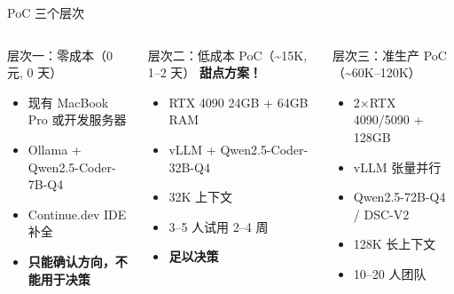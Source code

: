 \documentclass[UTF8,11pt,aspectratio=169]{beamer}
\begin{document}
\begin{frame}{PoC 三个层次}
  \begin{columns}[T]
    \begin{block}{层次一：零成本（0 元, 0 天）}
      \begin{itemize}
        \item 现有 MacBook Pro 或开发服务器
        \item Ollama + Qwen2.5-Coder-7B-Q4
        \item Continue.dev IDE 补全
        \item \textbf{只能确认方向，不能用于决策}
      \end{itemize}
    \end{block}

    \begin{alertblock}{层次二：低成本 PoC（\textasciitilde \textyen{}15K, 1--2 天）}
      \textbf{甜点方案！}
      \begin{itemize}
        \item RTX 4090 24GB + 64GB RAM
        \item vLLM + Qwen2.5-Coder-32B-Q4
        \item 32K 上下文
        \item 3--5 人试用 2--4 周
        \item \textbf{足以决策}
      \end{itemize}
    \end{alertblock}

    \begin{block}{层次三：准生产 PoC（\textasciitilde \textyen{}60K--\textyen{}120K）}
      \begin{itemize}
        \item 2$\times$RTX 4090/5090 + 128GB
        \item vLLM 张量并行
        \item Qwen2.5-72B-Q4 / DSC-V2
        \item 128K 长上下文
        \item 10--20 人团队
      \end{itemize}
    \end{block}
  \end{columns}
\end{frame}
\end{document}
